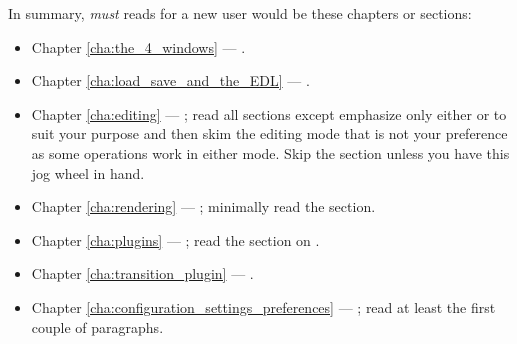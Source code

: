 In summary, \textit{must} reads for a new user would be these chapters or sections:

\begin{itemize}
    \item Chapter \ref{cha:the_4_windows} --- .
    \item Chapter \ref{cha:load_save_and_the_EDL} --- .
    \item Chapter \ref{cha:editing} --- ; read all sections except emphasize only either  or  to suit your purpose and then skim the editing mode that is not your preference as some operations work in either mode. 
        Skip the  section unless you have this jog wheel in hand.
    \item Chapter \ref{cha:rendering} --- ; minimally read the  section.
    \item Chapter \ref{cha:plugins} --- ; read the section on .
    \item Chapter \ref{cha:transition_plugin} --- .
    \item Chapter \ref{cha:configuration_settings_preferences} --- ; read at least the first couple of paragraphs.
\end{itemize}


